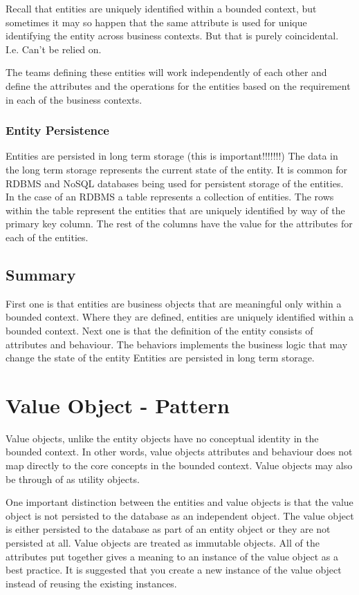 Recall that entities are uniquely identified within a bounded context, but sometimes it may so happen that the same attribute is used for unique identifying the entity across business contexts.
But that is purely coincidental.
I.e. Can't be relied on.

The teams defining these entities will work independently of each other and define the attributes and the operations for the entities based on the requirement in each of the business contexts.
\subsubsection{Entity Persistence}
Entities are persisted in long term storage (this is important!!!!!!!)
The data in the long term storage represents the current state of the entity.
It is common for RDBMS and NoSQL databases being used for persistent storage of the entities.
In the case of an RDBMS a table represents a collection of entities.
The rows within the table represent the entities that are uniquely identified by way of the primary key column.
The rest of the columns have the value for the attributes for each of the entities.

\subsection{Summary}
First one is that entities are business objects that are meaningful only within a bounded context.
Where they are defined, entities are uniquely identified within a bounded context.
Next one is that the definition of the entity consists of attributes and behaviour.
The behaviors implements the business logic that may change the state of the entity
Entities are persisted in long term storage.

\section{Value Object - Pattern}

Value objects, unlike the entity objects have no conceptual identity in the bounded context.
In other words, value objects attributes and behaviour does not map directly to the core concepts in the bounded context.
Value objects may also be through of as utility objects. %

One important distinction between the entities and value objects is that the value object is not persisted to the database as an independent object.
The value object is either persisted to the database as part of an entity object or they are not persisted at all.
Value objects are treated as immutable objects.
All of the attributes put together gives a meaning to an instance of the value object as a best practice.
It is suggested that you create a new instance of the value object instead of reusing the existing instances.

